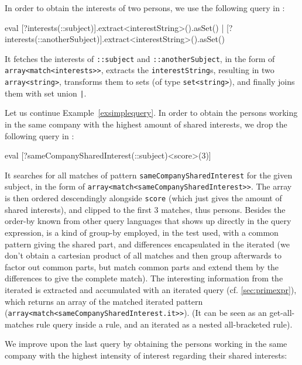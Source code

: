 \begin{example}
In order to obtain the interests of two persons, we use the following query in \GrShell:

	\begin{grshell}
eval [?interests(::subject)].extract<interestString>().asSet() | [?interests(::anotherSubject)].extract<interestString>().asSet()
  \end{grshell}
	
It fetches the interests of \texttt{::subject} and \texttt{::anotherSubject}, in the form of \texttt{array<match<interests>>}, extracts the \texttt{interestString}s, resulting in two \texttt{array<string>}, transforms them to sets (of type \texttt{set<string>}), and finally joins them with set union \texttt{|}.

\end{example}


\begin{example}
Let us continue Example~\ref{exsimplequery}. In order to obtain the persons working in the same company with the highest amount of shared interests, we drop the following query in \GrShell:

  \begin{grshell}
eval [?sameCompanySharedInterest(::subject)\orderDescendingBy<score>\keepFirst(3)]
  \end{grshell}

It searches for all matches of pattern \texttt{sameCompanySharedInterest} for the given subject, in the form of \texttt{array<match<sameCompanySharedInterest>>}.
The array is then ordered descendingly alongside \texttt{score} (which just gives the amount of shared interests), and clipped to the first 3 matches, thus persons.
Besides the order-by known from other query languages that shows up directly in the query expression, is a kind of group-by employed, in the test used, with a common pattern giving the shared part, and differences encapsulated in the iterated (we don't obtain a cartesian product of all matches and then group afterwards to factor out common parts, but match common parts and extend them by the differences to give the complete match).
The interesting information from the iterated is extracted and accumulated with an iterated query (cf. \ref{sec:primexpr}), which returns an array of the matched iterated pattern (\texttt{array<match<sameCompanySharedInterest.it>>}).
(It can be seen as an get-all-matches rule query inside a rule, and an iterated as a nested all-bracketed rule).

We improve upon the last query by obtaining the persons working in the same company with the highest intensity of interest regarding their shared interests:


\end{example}
